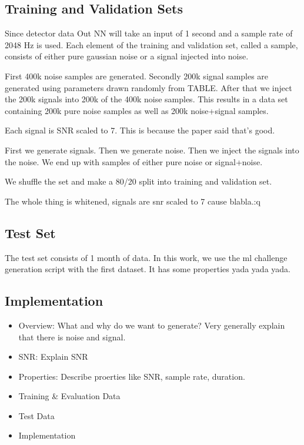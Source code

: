 \subsection{Training and Validation Sets}
Since detector data
Out NN will take an input of 1 second and a sample rate of 2048 Hz is used. 
Each element of the training and validation set, called a sample, consists of
either pure gaussian noise or a signal injected into noise.

First 400k noise samples are generated. Secondly 200k signal samples are
generated using parameters drawn randomly from TABLE. After that we inject the
200k signals into 200k of the 400k noise samples. This results in a data set
containing 200k pure noise samples as well as 200k noise+signal samples.

Each signal is SNR scaled to 7. This is because the paper said that's good.


First we generate signals. Then we generate noise. Then we inject the signals
into the noise. We end up with samples of either pure noise or signal+noise.

We shuffle the set and make a 80/20 split into training and validation set.

The whole thing is whitened, signals are snr scaled to 7 cause blabla.:q


\subsection{Test Set}
The test set consists of 1 month of data. In this work, we use the ml challenge
generation script with the first dataset. It has some properties yada yada yada.

\subsection{Implementation}

\begin{itemize}
  \item Overview: What and why do we want to generate? Very generally explain
        that there is noise and signal.
  \item SNR: Explain SNR
  \item Properties: Describe proerties like SNR, sample rate, duration.
  \item Training \& Evaluation Data
  \item Test Data
  \item Implementation
\end{itemize}
